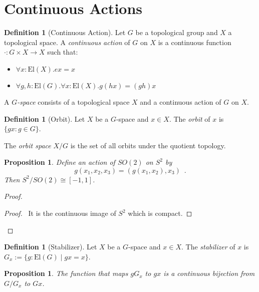 \documentclass{book}
\let\qed\relax
\newtheorem{prop}[ax]{Proposition}
\theoremstyle{definition}
\newtheorem{df}[ax]{Definition}
\newcommand{\El}[1]{\ensuremath{\mathrm{El} \left( {#1} \right)}}
\begin{document}
\section{Continuous Actions}

\begin{df}[Continuous Action]
Let $G$ be a topological group and $X$ a topological space. A \emph{continuous action} of $G$ on $X$ is a continuous function $\cdot : G \times X \rightarrow X$ such that:
\begin{itemize}
\item $\forall x : \El{X}. ex = x$
\item $\forall g,h : \El{G}. \forall x : \El{X}. g(hx) = (gh)x$
\end{itemize}

A \emph{$G$-space} consists of a topological space $X$ and a continuous action of $G$ on $X$.
\end{df}

\begin{df}[Orbit]
Let $X$ be a $G$-space and $x \in X$. The \emph{orbit} of $x$ is $\{ gx : g \in G \}$.

The \emph{orbit space} $X / G$ is the set of all orbits under the quotient topology.
\end{df}

\begin{prop}
Define an action of $SO(2)$ on $S^2$ by 
\[ g(x_1, x_2, x_3) = (g(x_1, x_2), x_3) \enspace . \] Then $S^2 / SO(2) \cong [-1,1]$.
\end{prop}

\begin{proof}
\pf
{}
\begin{proof}
	\pf\ It is the continuous image of $S^2$ which is compact.
\end{proof}
\qed
\end{proof}

\begin{df}[Stabilizer]
Let $X$ be a $G$-space and $x \in X$. The \emph{stabilizer} of $x$ is $G_x := \{ g : \El{G} \mid gx = x \}$.
\end{df}

\begin{prop}
The function that maps $gG_x$ to $gx$ is a continuous bijection from $G / G_x$ to $Gx$.
\end{prop}
\end{document}
